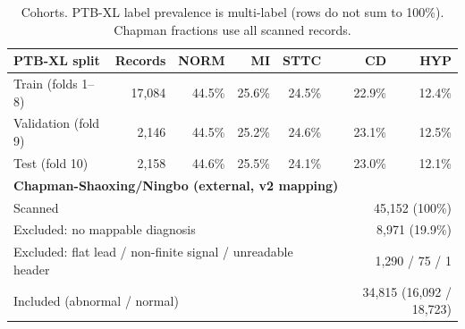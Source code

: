 \begin{table}[H]
\centering
\small
\caption{Cohorts. PTB-XL label prevalence is multi-label (rows do not sum to 100\%). Chapman fractions use all scanned records.}
\label{tab:data}
\begin{tabular}{lrrrrrr}
\toprule
PTB-XL split & Records & NORM & MI & STTC & CD & HYP \\
\midrule
Train (folds 1--8) & 17,084 & 44.5\% & 25.6\% & 24.5\% & 22.9\% & 12.4\% \\
Validation (fold 9) & 2,146 & 44.5\% & 25.2\% & 24.6\% & 23.1\% & 12.5\% \\
Test (fold 10) & 2,158 & 44.6\% & 25.5\% & 24.1\% & 23.0\% & 12.1\% \\
\midrule
\multicolumn{7}{l}{\textbf{Chapman-Shaoxing/Ningbo (external, v2 mapping)}} \\
\multicolumn{5}{l}{Scanned} & \multicolumn{2}{r}{45,152 (100\%)} \\
\multicolumn{5}{l}{Excluded: no mappable diagnosis} & \multicolumn{2}{r}{8,971 (19.9\%)} \\
\multicolumn{5}{l}{Excluded: flat lead / non-finite signal / unreadable header} & \multicolumn{2}{r}{1,290 / 75 / 1} \\
\multicolumn{5}{l}{Included (abnormal / normal)} & \multicolumn{2}{r}{34,815 (16,092 / 18,723)} \\
\bottomrule
\end{tabular}
\end{table}
